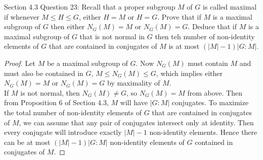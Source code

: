 Section 4.3 Question 23: Recall that a proper subgroup $M$ of $G$ is called
maximal if whenever $M\leq H\leq G$, either $H=M$ or $H=G$. Prove that if
$M$ is a maximal subgroup of $G$ then either $N_G(M)=M$ or $N_G(M)=G$.
Deduce that if $M$ is a maximal subgroup of $G$ that is not normal in $G$
then teh number of non-identity elements of $G$ that are contained in
conjugates of $M$ is at most $(|M|-1)|G:M|$.

\begin{proof}
  Let $M$ be a maximal subgroup of $G$. Now $N_G(M)$ must contain $M$
  and must also be contained in $G$, $M\leq N_G(M)\leq G$, which implies
  either $N_G(M)=M$ or $N_G(M)=G$ by maximality of $M$. \\

  If $M$ is not normal, then $N_G(M)\neq G$, so $N_G(M)=M$ from above.
  Then from Proposition 6 of Section 4.3, $M$ will have $|G:M|$
  conjugates. To maximize the total number of non-identity elements of
  $G$ that are contained in conjugates of $M$, we can assume that any
  pair of conjugates intersect only at identity. Then every conjugate
  will introduce exactly $|M|-1$ non-identity elements. Hence there can
  be at most $(|M|-1)|G:M|$ non-identity elements of $G$ contained in
  conjugates of $M$.
\end{proof}
